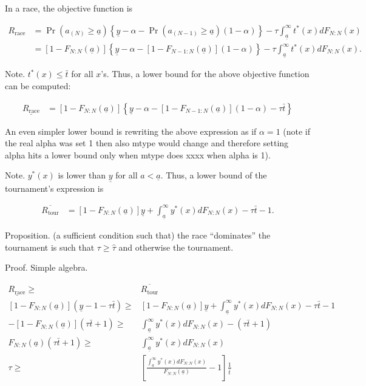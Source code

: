 \documentclass[12pt,]{article}
\theoremstyle{plain} %
\newcommand\deadline{\bar{t}}
\newcommand\target{\underline{y}}
\newcommand\race{\text{race}}
\newcommand\tournament{\text{tour}}
\newcommand\mtype{\underline{a}}
\begin{document}
In a race, the objective function is

\begin{align}
R_\race & =  
  \Pr(a_{(N)}\geq \mtype) \left\{\target - \alpha -
  \Pr(a_{(N-1)}\geq \mtype) (1-\alpha) \right\}
  - \tau \int_{\mtype}^{\infty} t^*(x) dF_{N:N}(x) \nonumber\\
  & = [1-F_{N:N}(\mtype)] \left\{\target - \alpha -
  [1-F_{N-1:N}(\mtype)] (1 - \alpha) \right\}
  - \tau \int_{\mtype}^{\infty} t^*(x) dF_{N:N}(x).
\end{align}

Note. \(t^*(x) \leq \deadline\) for all \(x\)'s. Thus, a lower bound for
the above objective function can be computed:

\begin{align}
\underline {R_\race} & = 
  [1-F_{N:N}(\mtype)] \left\{\target - \alpha -
  [1-F_{N-1:N}(\mtype)] (1 - \alpha) - \tau \deadline\right\}
\end{align}

An even simpler lower bound is rewriting the above expression as if
\(\alpha=1\) (note if the real alpha was set 1 then also mtype would
change and therefore setting alpha hits a lower bound only when mtype
does xxxx when alpha is 1).

Note. \(y^*(x)\) is lower than \(\target\) for all \(a < \mtype\). Thus,
a lower bound of the tournament's expression is

\begin{align}
\overline {R_\tournament} & = 
  [1-F_{N:N}(\mtype)] \target + \int_{\mtype}^\infty y^*(x) dF_{N:N}(x) 
  - \tau \deadline - 1. 
\end{align}

Proposition. (a sufficient condition such that) the race ``dominates''
the tournament is such that \(\tau \geq \hat \tau\) and otherwise the
tournament.

Proof. Simple algebra.

\begin{align}
  \underline {R_\race} \geq & \overline {R_\tournament} \nonumber\\
  [1-F_{N:N}(\mtype)] (\target - 1 - \tau \deadline) \geq &
  [1-F_{N:N}(\mtype)] \target + \int_{\mtype}^\infty y^*(x) dF_{N:N}(x) 
  - \tau \deadline - 1 \nonumber\\
  - [1-F_{N:N}(\mtype)] (\tau\deadline + 1) \geq &
  \int_{\mtype}^\infty y^*(x) dF_{N:N}(x) 
  - (\tau \deadline + 1) \nonumber\\
  F_{N:N}(\mtype) (\tau \deadline + 1) \geq &
  \int_{\mtype}^\infty y^*(x) dF_{N:N}(x) \nonumber\\
  \tau \geq & 
    \left[
      \frac{\int_{\mtype}^\infty y^*(x) dF_{N:N}(x)}{F_{N:N}(\mtype)} -1 
    \right] \frac{1}{\deadline}
\end{align}
\end{document}
